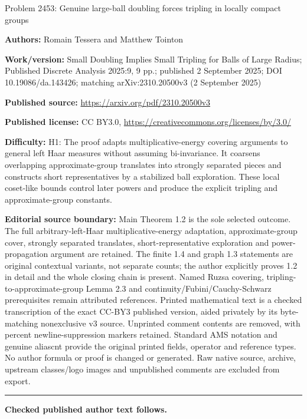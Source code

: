 \documentclass[10pt]{article}
\begin{document}
\begin{center}\Large Problem 2453: Genuine large-ball doubling forces tripling in locally compact groups\end{center}\noindent\textbf{Authors:} Romain Tessera and Matthew Tointon\par\noindent\textbf{Work/version:} Small Doubling Implies Small Tripling for Balls of Large Radius; Published Discrete Analysis 2025:9, 9 pp.; published 2 September 2025; DOI 10.19086/da.143426; matching arXiv:2310.20500v3 (2 September 2025)\par\noindent\textbf{Published source:} \url{https://arxiv.org/pdf/2310.20500v3}\par\noindent\textbf{Published license:} CC BY3.0, \url{https://creativecommons.org/licenses/by/3.0/}\par\noindent\textbf{Difficulty:} H1: The proof adapts multiplicative-energy covering arguments to general left Haar measures without assuming bi-invariance. It coarsens overlapping approximate-group translates into strongly separated pieces and constructs short representatives by a stabilized ball exploration. These local coset-like bounds control later powers and produce the explicit tripling and approximate-group constants.\par\medskip\noindent\textbf{Editorial source boundary:} Main Theorem 1.2 is the sole selected outcome. The full arbitrary-left-Haar multiplicative-energy adaptation, approximate-group cover, strongly separated translates, short-representative exploration and power-propagation argument are retained. The finite 1.4 and graph 1.3 statements are original contextual variants, not separate counts; the author explicitly proves 1.2 in detail and the whole closing chain is present. Named Ruzsa covering, tripling-to-approximate-group Lemma 2.3 and continuity/Fubini/Cauchy-Schwarz prerequisites remain attributed references. Printed mathematical text is a checked transcription of the exact CC-BY3 published version, aided privately by its byte-matching nonexclusive v3 source. Unprinted comment contents are removed, with percent newline-suppression markers retained. Standard AMS notation and genuine aliascnt provide the original printed fields, operator and reference types. No author formula or proof is changed or generated. Raw native source, archive, upstream classes/logo images and unpublished comments are excluded from export.\par\medskip\hrule\medskip\noindent\textbf{Checked published author text follows.}\par
\end{document}
